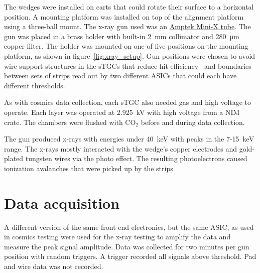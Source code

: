 The wedges were installed on carts that could rotate their surface to a horizontal position. A mounting platform was installed on top of the alignment platform using a three-ball mount. The x-ray gun used was an \href{https://www.amptek.com/-/media/ametekamptek/documents/resources/specs/mini-x-specifications.pdf?la=en\&revision=512f7eb3-01b3-47fd-864f-5525c850fc6e\&hash=B8B03C0592486E2D91C566C4326F15F5}{Amptek Mini-X tube}. The gun was placed in a brass holder with built-in \SI{2}{mm} collimator and \SI{280}{\micro\meter} copper filter. The holder was mounted on one of five positions on the mounting platform, as shown in figure~\ref{fig:xray_setup}. Gun positions were chosen to avoid wire support structures in the sTGCs that reduce hit efficiency~\cite{lefebvre_thesis} and boundaries between sets of strips read out by two different ASICs that could each have different thresholds. 

As with cosmics data collection, each sTGC also needed gas and high voltage to operate. Each layer was operated at \SI{2.925}{kV} with high voltage from a NIM crate. The chambers were flushed with CO$_2$ before and during data collection.

The gun produced x-rays with energies under \SI{40}{\kilo\electronvolt} with peaks in the 7-\SI{15}{keV} range. The x-rays mostly interacted with the wedge's copper electrodes and gold-plated tungsten wires via the photo effect. The resulting photoelectrons caused ionization avalanches that were picked up by the strips.

\section{Data acquisition}

A different version of the same front end electronics, but the same ASIC, as used in cosmics testing were used for the x-ray testing to amplify the data and measure the peak signal amplitude. Data was collected for two minutes per gun position with random triggers. A trigger recorded all signals above threshold. Pad and wire data was not recorded.

